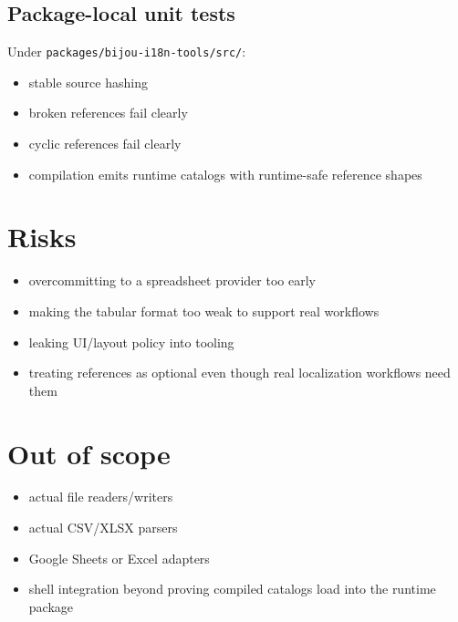 \subsection{Package-local unit tests}\label{record-189-package-local-unit-tests}

Under \texttt{p\allowbreak{}a\allowbreak{}c\allowbreak{}k\allowbreak{}a\allowbreak{}g\allowbreak{}e\allowbreak{}s\allowbreak{}/\allowbreak{}b\allowbreak{}i\allowbreak{}j\allowbreak{}o\allowbreak{}u\allowbreak{}-\allowbreak{}i\allowbreak{}1\allowbreak{}8\allowbreak{}n\allowbreak{}-\allowbreak{}t\allowbreak{}o\allowbreak{}o\allowbreak{}l\allowbreak{}s\allowbreak{}/\allowbreak{}s\allowbreak{}r\allowbreak{}c\allowbreak{}/}:

\begin{itemize}
\tightlist
\item
  stable source hashing
\item
  broken references fail clearly
\item
  cyclic references fail clearly
\item
  compilation emits runtime catalogs with runtime-safe reference shapes
\end{itemize}

\section{Risks}\label{record-189-risks}

\begin{itemize}
\tightlist
\item
  overcommitting to a spreadsheet provider too early
\item
  making the tabular format too weak to support real workflows
\item
  leaking UI/layout policy into tooling
\item
  treating references as optional even though real localization workflows need them
\end{itemize}

\section{Out of scope}\label{record-189-out-of-scope}

\begin{itemize}
\tightlist
\item
  actual file readers/writers
\item
  actual CSV/XLSX parsers
\item
  Google Sheets or Excel adapters
\item
  shell integration beyond proving compiled catalogs load into the runtime package
\end{itemize}

